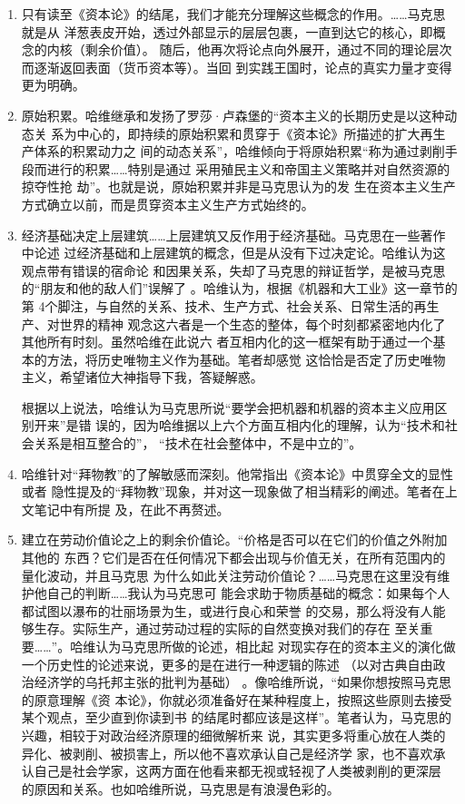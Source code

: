 \begin{enumerate}

\item 只有读至《资本论》的结尾，我们才能充分理解这些概念的作用。……马克思就是从
洋葱表皮开始，透过外部显示的层层包裹，一直到达它的核心，即概念的内核（剩余价值）。
随后，他再次将论点向外展开，通过不同的理论层次而逐渐返回表面（货币资本等）。当回
到实践王国时，论点的真实力量才变得更为明确。


\item 原始积累。哈维继承和发扬了罗莎·卢森堡的“资本主义的长期历史是以这种动态关
系为中心的，即持续的原始积累和贯穿于《资本论》所描述的扩大再生产体系的积累动力之
间的动态关系”，哈维倾向于将原始积累“称为通过剥削手段而进行的积累……特别是通过
采用殖民主义和帝国主义策略并对自然资源的掠夺性抢
劫”。也就是说，原始积累并非是马克思认为的发
生在资本主义生产方式确立以前，而是贯穿资本主义生产方式始终的。

\item 经济基础决定上层建筑……上层建筑又反作用于经济基础。马克思在一些著作中论述
过经济基础和上层建筑的概念，但是从没有下过决定论。哈维认为这观点带有错误的宿命论
和因果关系，失却了马克思的辩证哲学，是被马克思的“朋友和他的敌人们”误解了
。哈维认为，根据《机器和大工业》这一章节的第
4个脚注，与自然的关系、技术、生产方式、社会关系、日常生活的再生产、对世界的精神
观念这六者是一个生态的整体，每个时刻都紧密地内化了其他所有时刻。虽然哈维在此说六
者互相内化的这一框架有助于通过一个基本的方法，将历史唯物主义作为基础。笔者却感觉
这恰恰是否定了历史唯物主义，希望诸位大神指导下我，答疑解惑。

根据以上说法，哈维认为马克思所说“要学会把机器和机器的资本主义应用区别开来”是错
误的，因为哈维据以上六个方面互相内化的理解，认为“技术和社会关系是相互整合的”，
“技术在社会整体中，不是中立的”。


\item 哈维针对“拜物教”的了解敏感而深刻。他常指出《资本论》中贯穿全文的显性或者
隐性提及的“拜物教”现象，并对这一现象做了相当精彩的阐述。笔者在上文笔记中有所提
及，在此不再赘述。

\item 建立在劳动价值论之上的剩余价值论。“价格是否可以在它们的价值之外附加其他的
东西？它们是否在任何情况下都会出现与价值无关，在所有范围内的量化波动，并且马克思
为什么如此关注劳动价值论？……马克思在这里没有维护他自己的判断……我认为马克思可
能会求助于物质基础的概念：如果每个人都试图以瀑布的壮丽场景为生，或进行良心和荣誉
的交易，那么将没有人能够生存。实际生产，通过劳动过程的实际的自然变换对我们的存在
至关重要……”。哈维认为马克思所做的论述，相比起
对现实存在的资本主义的演化做一个历史性的论述来说，更多的是在进行一种逻辑的陈述
（以对古典自由政治经济学的乌托邦主张的批判为基础）
。像哈维所说，“如果你想按照马克思的原意理解《资
本论》，你就必须准备好在某种程度上，按照这些原则去接受某个观点，至少直到你读到书
的结尾时都应该是这样”。笔者认为，马克思的兴趣，相较于对政治经济原理的细微解析来
说，其实更多将重心放在人类的异化、被剥削、被损害上，所以他不喜欢承认自己是经济学
家，也不喜欢承认自己是社会学家，这两方面在他看来都无视或轻视了人类被剥削的更深层
的原因和关系。也如哈维所说，马克思是有浪漫色彩的。


\end{enumerate}
